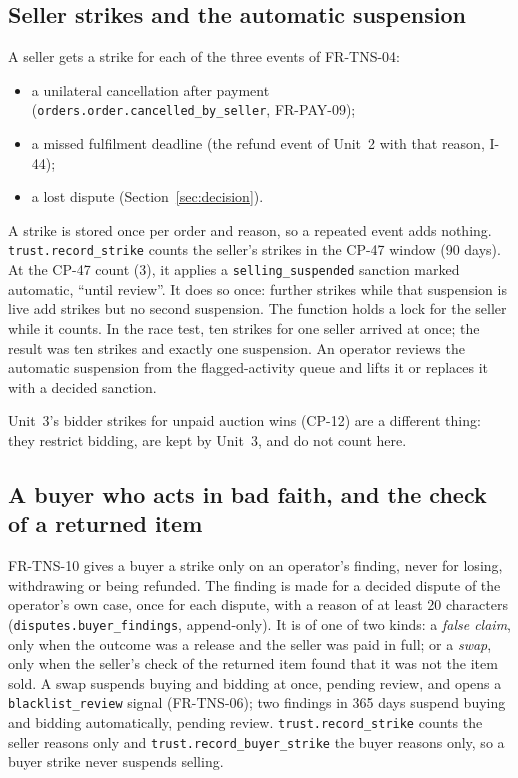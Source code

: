 \documentclass[11pt,a4paper]{article}
\begin{document}
\subsection{Seller strikes and the automatic suspension}
\label{sec:strikes}
A seller gets a strike for each of the three events of FR-TNS-04:
\begin{itemize}[nosep]
  \item a unilateral cancellation after payment (\texttt{orders.order.cancelled\_by\_seller}, FR-PAY-09);
  \item a missed fulfilment deadline (the refund event of Unit~2 with that reason, I-44);
  \item a lost dispute (Section~\ref{sec:decision}).
\end{itemize}
A strike is stored once per order and reason, so a repeated event adds nothing. \texttt{trust.\allowbreak record\_strike} counts the seller's strikes in the CP-47 window (90 days). At the CP-47 count (3), it applies a \texttt{selling\_suspended} sanction marked automatic, ``until review''. It does so once: further strikes while that suspension is live add strikes but no second suspension. The function holds a lock for the seller while it counts. In the race test, ten strikes for one seller arrived at once; the result was ten strikes and exactly one suspension. An operator reviews the automatic suspension from the flagged-activity queue and lifts it or replaces it with a decided sanction.

Unit~3's bidder strikes for unpaid auction wins (CP-12) are a different thing: they restrict bidding, are kept by Unit~3, and do not count here.

\subsection{A buyer who acts in bad faith, and the check of a returned item}
\label{sec:buyerfinding}
FR-TNS-10 gives a buyer a strike only on an operator's finding, never for losing, withdrawing or being refunded. The finding is made for a decided dispute of the operator's own case, once for each dispute, with a reason of at least 20 characters (\texttt{disputes.buyer\_findings}, append-only). It is of one of two kinds: a \emph{false claim}, only when the outcome was a release and the seller was paid in full; or a \emph{swap}, only when the seller's check of the returned item found that it was not the item sold. A swap suspends buying and bidding at once, pending review, and opens a \texttt{blacklist\_review} signal (FR-TNS-06); two findings in 365 days suspend buying and bidding automatically, pending review. \texttt{trust.\allowbreak record\_strike} counts the seller reasons only and \texttt{trust.\allowbreak record\_buyer\_strike} the buyer reasons only, so a buyer strike never suspends selling.
\end{document}
